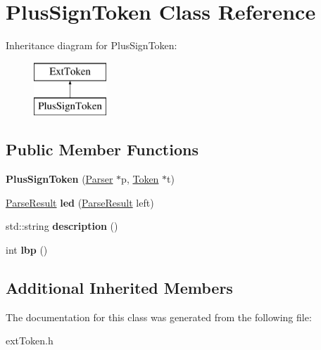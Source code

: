 \hypertarget{class_plus_sign_token}{}\section{Plus\+Sign\+Token Class Reference}
\label{class_plus_sign_token}
Inheritance diagram for Plus\+Sign\+Token\+:\begin{figure}[H]
\begin{center}
\leavevmode
\includegraphics[height=2.000000cm]{class_plus_sign_token}
\end{center}
\end{figure}
\subsection*{Public Member Functions}
\begin{DoxyCompactItemize}
\item 
\hypertarget{class_plus_sign_token_ad480457c426f911f8286a73e8cf7f949}{}{\bfseries Plus\+Sign\+Token} (\hyperlink{class_parser}{Parser} $\ast$p, \hyperlink{class_token}{Token} $\ast$t)\label{class_plus_sign_token_ad480457c426f911f8286a73e8cf7f949}

\item 
\hypertarget{class_plus_sign_token_a4d79a17891f92800259308ce71402526}{}\hyperlink{class_parse_result}{Parse\+Result} {\bfseries led} (\hyperlink{class_parse_result}{Parse\+Result} left)\label{class_plus_sign_token_a4d79a17891f92800259308ce71402526}

\item 
\hypertarget{class_plus_sign_token_a61a05ac9660848e13da97d5746808868}{}std\+::string {\bfseries description} ()\label{class_plus_sign_token_a61a05ac9660848e13da97d5746808868}

\item 
\hypertarget{class_plus_sign_token_a80753eec970928e042da350df83150f2}{}int {\bfseries lbp} ()\label{class_plus_sign_token_a80753eec970928e042da350df83150f2}

\end{DoxyCompactItemize}
\subsection*{Additional Inherited Members}


The documentation for this class was generated from the following file\+:\begin{DoxyCompactItemize}
\item 
ext\+Token.\+h\end{DoxyCompactItemize}
